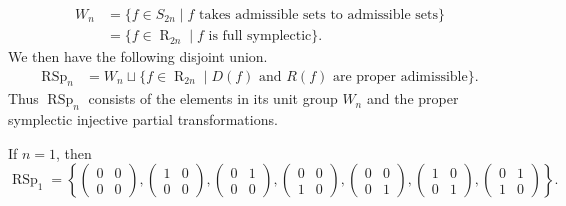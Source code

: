 \documentclass[11pt]{article}
\DeclareMathOperator{\RSp}{RSp}
\DeclareMathOperator{\R}{R}
\begin{document}
  \begin{align*}
     W_n &= \{f\in S_{2n}\mid f \text{ takes admissible sets to admissible sets}\}\\
        &= \{f\in\R_{2n}\mid f \text{ is full symplectic}\}.
  \end{align*}
%
We then have the following disjoint union.
\[
    \begin{aligned}
        \RSp_n   &= W_n \sqcup\{f\in \R_{2n} \mid D(f) \mbox{ and }R(f) \mbox{ are proper adimissible}\}.
    \end{aligned}
\]
Thus
$\RSp_n$ consists of the elements in its unit group $W_n$ and the proper symplectic injective partial transformations. 

If $n=1$, then 
$$
     \RSp_1 = \left\{  \begin{pmatrix}
                        0&0\\
                        0&0
                        \end{pmatrix},
                        \begin{pmatrix}
                        1&0\\
                        0&0
                        \end{pmatrix},
                        \begin{pmatrix}
                        0&1\\
                        0&0
                        \end{pmatrix},
                        \begin{pmatrix}
                        0&0\\
                        1&0
                        \end{pmatrix},
                        \begin{pmatrix}
                        0&0\\
                        0&1
                        \end{pmatrix},
                        \begin{pmatrix}
                        1&0\\
                        0&1
                        \end{pmatrix},
                        \begin{pmatrix}
                        0&1\\
                        1&0
                        \end{pmatrix}
                        \right\}.
$$
\end{document}
